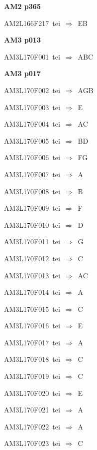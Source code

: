 \par\vfill\eject
{\bf\hfill AM2 p365\hfill\hbox{}}\par\bigskip
{\sixrm AM2L166F217\ {\sixit tei}\ }$\Rightarrow$\ EB\par\smallskip

\par\vfill\eject
{\bf\hfill AM3 p013\hfill\hbox{}}\par\bigskip
{\sixrm AM3L170F001\ {\sixit tei}\ }$\Rightarrow$\ ABC\par\smallskip

\par\vfill\eject
{\bf\hfill AM3 p017\hfill\hbox{}}\par\bigskip
{\sixrm AM3L170F002\ {\sixit tei}\ }$\Rightarrow$\ AGB\par\smallskip
{\sixrm AM3L170F003\ {\sixit tei}\ }$\Rightarrow$\ E\par\smallskip
{\sixrm AM3L170F004\ {\sixit tei}\ }$\Rightarrow$\ AC\par\smallskip
{\sixrm AM3L170F005\ {\sixit tei}\ }$\Rightarrow$\ BD\par\smallskip
{\sixrm AM3L170F006\ {\sixit tei}\ }$\Rightarrow$\ FG\par\smallskip
{\sixrm AM3L170F007\ {\sixit tei}\ }$\Rightarrow$\ A\par\smallskip
{\sixrm AM3L170F008\ {\sixit tei}\ }$\Rightarrow$\ B\par\smallskip
{\sixrm AM3L170F009\ {\sixit tei}\ }$\Rightarrow$\ F\par\smallskip
{\sixrm AM3L170F010\ {\sixit tei}\ }$\Rightarrow$\ D\par\smallskip
{\sixrm AM3L170F011\ {\sixit tei}\ }$\Rightarrow$\ G\par\smallskip
{\sixrm AM3L170F012\ {\sixit tei}\ }$\Rightarrow$\ C\par\smallskip
{\sixrm AM3L170F013\ {\sixit tei}\ }$\Rightarrow$\ AC\par\smallskip
{\sixrm AM3L170F014\ {\sixit tei}\ }$\Rightarrow$\ A\par\smallskip
{\sixrm AM3L170F015\ {\sixit tei}\ }$\Rightarrow$\ C\par\smallskip
{\sixrm AM3L170F016\ {\sixit tei}\ }$\Rightarrow$\ E\par\smallskip
{\sixrm AM3L170F017\ {\sixit tei}\ }$\Rightarrow$\ A\par\smallskip
{\sixrm AM3L170F018\ {\sixit tei}\ }$\Rightarrow$\ C\par\smallskip
{\sixrm AM3L170F019\ {\sixit tei}\ }$\Rightarrow$\ C\par\smallskip
{\sixrm AM3L170F020\ {\sixit tei}\ }$\Rightarrow$\ E\par\smallskip
{\sixrm AM3L170F021\ {\sixit tei}\ }$\Rightarrow$\ A\par\smallskip
{\sixrm AM3L170F022\ {\sixit tei}\ }$\Rightarrow$\ A\par\smallskip
{\sixrm AM3L170F023\ {\sixit tei}\ }$\Rightarrow$\ C\par\smallskip

